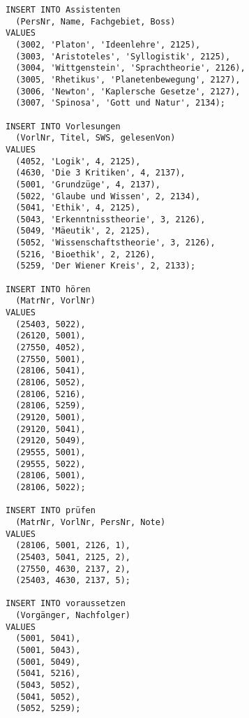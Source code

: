 \documentclass{lehramt-informatik-aufgabe}
\begin{document}
\begin{verbatim}
INSERT INTO Assistenten
  (PersNr, Name, Fachgebiet, Boss)
VALUES
  (3002, 'Platon', 'Ideenlehre', 2125),
  (3003, 'Aristoteles', 'Syllogistik', 2125),
  (3004, 'Wittgenstein', 'Sprachtheorie', 2126),
  (3005, 'Rhetikus', 'Planetenbewegung', 2127),
  (3006, 'Newton', 'Kaplersche Gesetze', 2127),
  (3007, 'Spinosa', 'Gott und Natur', 2134);

INSERT INTO Vorlesungen
  (VorlNr, Titel, SWS, gelesenVon)
VALUES
  (4052, 'Logik', 4, 2125),
  (4630, 'Die 3 Kritiken', 4, 2137),
  (5001, 'Grundzüge', 4, 2137),
  (5022, 'Glaube und Wissen', 2, 2134),
  (5041, 'Ethik', 4, 2125),
  (5043, 'Erkenntnisstheorie', 3, 2126),
  (5049, 'Mäeutik', 2, 2125),
  (5052, 'Wissenschaftstheorie', 3, 2126),
  (5216, 'Bioethik', 2, 2126),
  (5259, 'Der Wiener Kreis', 2, 2133);

INSERT INTO hören
  (MatrNr, VorlNr)
VALUES
  (25403, 5022),
  (26120, 5001),
  (27550, 4052),
  (27550, 5001),
  (28106, 5041),
  (28106, 5052),
  (28106, 5216),
  (28106, 5259),
  (29120, 5001),
  (29120, 5041),
  (29120, 5049),
  (29555, 5001),
  (29555, 5022),
  (28106, 5001),
  (28106, 5022);

INSERT INTO prüfen
  (MatrNr, VorlNr, PersNr, Note)
VALUES
  (28106, 5001, 2126, 1),
  (25403, 5041, 2125, 2),
  (27550, 4630, 2137, 2),
  (25403, 4630, 2137, 5);

INSERT INTO voraussetzen
  (Vorgänger, Nachfolger)
VALUES
  (5001, 5041),
  (5001, 5043),
  (5001, 5049),
  (5041, 5216),
  (5043, 5052),
  (5041, 5052),
  (5052, 5259);
\end{verbatim}
\end{document}
